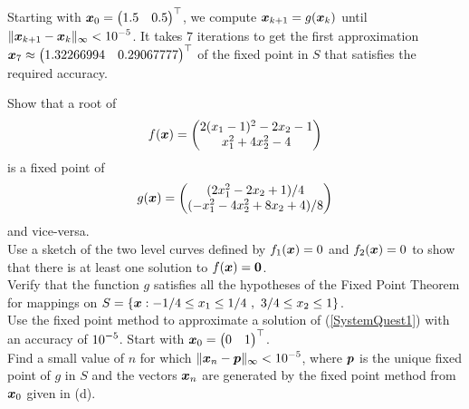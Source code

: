 {Starting with
$\displaystyle \bm{x}_0 = \begin{pmatrix} 1.5 & 0.5 \end{pmatrix}^\top$,
we compute $\bm{x}_{k+1} = g(\bm{x}_k)$ until
$\displaystyle \|\bm{x}_{k+1} - \bm{x}_k\|_\infty < 10^{-5}$.
It takes $7$ iterations to get the first approximation
$\displaystyle \bm{x}_7 \approx \begin{pmatrix} 1.32266994 & 0.29067777
\end{pmatrix}^\top$ of the fixed point in $S$ that satisfies the
required accuracy.
}

\begin{question}
 Show that a root of
\begin{equation} \label{SystemQuest1}
f(\bm{x}) = \begin{pmatrix}
2(x_1-1)^2 - 2x_2 - 1 \\
x_1^2 + 4x_2^2 - 4
\end{pmatrix}
\end{equation}
is a fixed point of
\[
g(\bm{x}) =
\begin{pmatrix}
(2x_1^2 - 2x_2 +1)/4 \\
(-x_1^2 - 4x_2^2 + 8x_2 + 4)/8
\end{pmatrix}
\]
and vice-versa.\\
 Use a sketch of the two level curves defined by $f_1(\bm{x})=0$
and $f_2(\bm{x}) =0$ to show that there is at least one solution to
$f(\bm{x}) = \bm{0}$.\\
 Verify that the function $g$ satisfies all the hypotheses
of the Fixed Point Theorem for mappings on
$S =\left\{ \VEC{x} : -1/4 \leq x_1 \leq 1/4 \ ,
\ 3/4 \leq x_2 \leq 1 \right\}$.\\
 Use the fixed point method to approximate a
solution of (\ref{SystemQuest1}) with an accuracy of
$\displaystyle 10^{-5}$.  Start with
$\displaystyle \bm{x}_0 = \begin{pmatrix} 0 & 1 \end{pmatrix}^\top$.\\
 Find a small value of $n$ for which 
$\displaystyle \| \bm{x}_n - \bm{p}\|_\infty < 10^{-5}$, where $\bm{p}$ is the
unique fixed point of $g$ in $S$ and the vectors $\bm{x}_n$
are generated by the fixed point method from $\bm{x}_0$ given in (d).
\end{question}

% 
% 
%
%
%

